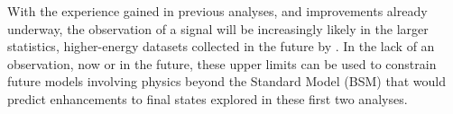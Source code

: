 \par With the experience gained in previous analyses, and improvements
already underway, the observation of a \ttH signal will be
increasingly likely in the larger statistics, higher-energy datasets
collected in the future by \ttH.  In the lack of an observation, now
or in the future, these upper limits can be used to constrain future
models involving physics beyond the Standard Model (BSM) that would
predict enhancements to final states explored in these first two \ttH
analyses.  